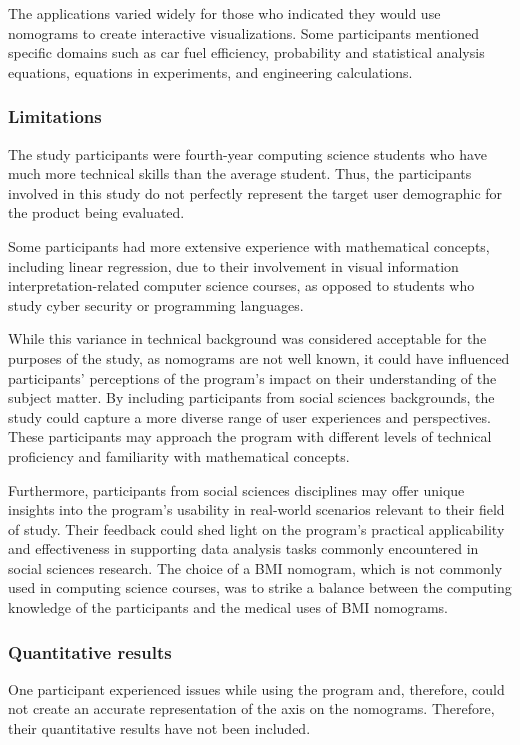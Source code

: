 \documentclass{l4proj}
\begin{document}
The applications varied widely for those who indicated they would use nomograms to create interactive visualizations. Some participants mentioned specific domains such as car fuel efficiency, probability and statistical analysis equations, equations in experiments, and engineering calculations. 

\subsubsection{Limitations}

The study participants were fourth-year computing science students who have much more technical skills than the average student. Thus, the participants involved in this study do not perfectly represent the target user demographic for the product being evaluated. 

Some participants had more extensive experience with mathematical concepts, including linear regression, due to their involvement in visual information interpretation-related computer science courses, as opposed to students who study cyber security or programming languages. 

While this variance in technical background was considered acceptable for the purposes of the study, as nomograms are not well known, it could have influenced participants' perceptions of the program's impact on their understanding of the subject matter. By including participants from social sciences backgrounds, the study could capture a more diverse range of user experiences and perspectives. These participants may approach the program with different levels of technical proficiency and familiarity with mathematical concepts.

Furthermore, participants from social sciences disciplines may offer unique insights into the program's usability in real-world scenarios relevant to their field of study. Their feedback could shed light on the program's practical applicability and effectiveness in supporting data analysis tasks commonly encountered in social sciences research. The choice of a BMI nomogram, which is not commonly used in computing science courses, was to strike a balance between the computing knowledge of the participants and the medical uses of BMI nomograms. 

\subsubsection{Quantitative results}

One participant experienced issues while using the program and, therefore, could not create an accurate representation of the axis on the nomograms. Therefore, their quantitative results have not been included.
\end{document}
